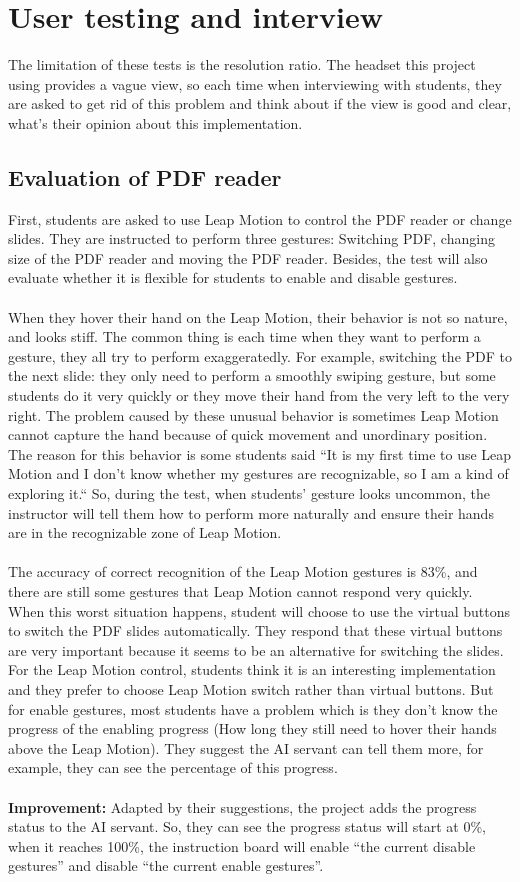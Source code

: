 \section{User testing and interview}
The limitation of these tests is the resolution ratio. The headset this project using provides a vague view, so each time when interviewing with students, they are asked to get rid of this problem and think about if the view is good and clear, what’s their opinion about this implementation.
\subsection{Evaluation of PDF reader}
First, students are asked to use Leap Motion to control the PDF reader or change slides. They are instructed to perform three gestures: Switching PDF, changing size of the PDF reader and moving the PDF reader. Besides, the test will also evaluate whether it is flexible for students to enable and disable gestures.
\\
\\
When they hover their hand on the Leap Motion, their behavior is not so nature, and looks stiff. The common thing is each time when they want to perform a gesture, they all try to perform exaggeratedly. For example, switching the PDF to the next slide: they only need to perform a smoothly swiping gesture, but some students do it very quickly or they move their hand from the very left to the very right. The problem caused by these unusual behavior is sometimes Leap Motion cannot capture the hand because of quick movement and unordinary position. The reason for this behavior is some students said “It is my first time to use Leap Motion and I don't know whether my gestures are recognizable, so I am a kind of exploring it.“ So, during the test, when students’ gesture looks uncommon, the instructor will tell them how to perform more naturally and ensure their hands are in the recognizable zone of Leap Motion.
\\
\\ 
The accuracy of correct recognition of the Leap Motion gestures is 83\%, and there are still some gestures that Leap Motion cannot respond very quickly. When this worst situation happens, student will choose to use the virtual buttons to switch the PDF slides automatically. They respond that these virtual buttons are very important because it seems to be an alternative for switching the slides. 
For the Leap Motion control, students think it is an interesting implementation and they prefer to choose Leap Motion switch rather than virtual buttons. But for enable gestures, most students have a problem which is they don’t know the progress of the enabling progress (How long they still need to hover their hands above the Leap Motion). They suggest the AI servant can tell them more, for example, they can see the percentage of this progress. 
\\
\\
\textbf{Improvement:} Adapted by their suggestions, the project adds the progress status to the AI servant. So, they can see the progress status will start at 0\%, when it reaches 100\%, the instruction board will enable “the current disable gestures” and disable “the current enable gestures”.

